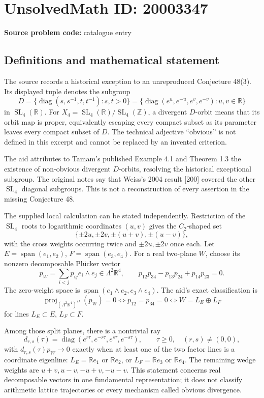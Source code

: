\documentclass[11pt]{article}
\newcommand{\Z}{\mathbb{Z}}
\newcommand{\R}{\mathbb{R}}
\begin{document}
\section*{UnsolvedMath ID: 20003347}
\textbf{Source problem code:} catalogue entry
\subsection{Definitions and mathematical statement}
The source records a historical exception to an unreproduced Conjecture 48(3). Its displayed tuple denotes the subgroup
\[
 D=\{\operatorname{diag}(s,s^{-1},t,t^{-1}):s,t>0\}
 =\{\operatorname{diag}(e^u,e^{-u},e^v,e^{-v}):u,v\in\R\}
\]
in \(\operatorname{SL}_4(\R)\). For \(X_4=\operatorname{SL}_4(\R)/\operatorname{SL}_4(\Z)\), a divergent \(D\)-orbit means that its orbit map is proper, equivalently escaping every compact subset as its parameter leaves every compact subset of \(D\). The technical adjective ``obvious'' is not defined in this excerpt and cannot be replaced by an invented criterion.

The aid attributes to Tamam's published Example 4.1 and Theorem 1.3 the existence of non-obvious divergent \(D\)-orbits, resolving the historical exceptional subgroup. The original notes say that Weiss's 2004 result [200] covered the other \(\operatorname{SL}_4\) diagonal subgroups. This is not a reconstruction of every assertion in the missing Conjecture 48.

The supplied local calculation can be stated independently. Restriction of the \(\operatorname{SL}_4\) roots to logarithmic coordinates \((u,v)\) gives the \(C_2\)-shaped set
\[
 \{\pm2u,\pm2v,\pm(u+v),\pm(u-v)\},
\]
with the cross weights occurring twice and \(\pm2u,\pm2v\) once each. Let \(E=\operatorname{span}(e_1,e_2)\), \(F=\operatorname{span}(e_3,e_4)\). For a real two-plane \(W\), choose its nonzero decomposable Pl\"ucker vector
\[
 p_W=\sum_{i<j}p_{ij}e_i\wedge e_j\in\Lambda^2\R^4,
 \qquad p_{12}p_{34}-p_{13}p_{24}+p_{14}p_{23}=0.
\]
The zero-weight space is \(\operatorname{span}(e_1\wedge e_2,e_3\wedge e_4)\). The aid's exact classification is
\[
 \operatorname{proj}_{(\Lambda^2\R^4)^D}(p_W)=0
 \Longleftrightarrow p_{12}=p_{34}=0
 \Longleftrightarrow W=L_E\oplus L_F
\]
for lines \(L_E\subset E\), \(L_F\subset F\).

Among those split planes, there is a nontrivial ray
\[
 d_{r,s}(\tau)=\operatorname{diag}(e^{r\tau},e^{-r\tau},e^{s\tau},e^{-s\tau}),
 \qquad\tau\geq0,\quad(r,s)\ne(0,0),
\]
with \(d_{r,s}(\tau)p_W\to0\) exactly when at least one of the two factor lines is a coordinate eigenline: \(L_E=\R e_1\) or \(\R e_2\), or \(L_F=\R e_3\) or \(\R e_4\). The remaining wedge weights are \(u+v,u-v,-u+v,-u-v\). This statement concerns real decomposable vectors in one fundamental representation; it does not classify arithmetic lattice trajectories or every mechanism called obvious divergence.
\end{document}
